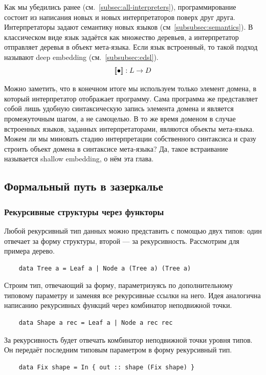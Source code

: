 
Как мы убедились ранее (см.~\ref{subsec:all-interpreters}), программирование состоит из написания новых и новых интерпретаторов поверх друг друга.
Интерпретаторы задают семантику новых языков (см~\ref{subsubsec:semantics}).
В классическом виде язык задаётся как множество деревьев, а интерпретатор отправляет деревья в объект мета-языка.
Если язык встроенный, то такой подход называют deep embedding (см.~\ref{subsubsec:edsl}).
\[
    \llbracket{\bullet}\rrbracket : L \to D
\]

Можно заметить, что в конечном итоге мы используем только элемент домена, в который интерпретатор отображает программу.
Сама программа же представляет собой лишь удобную синтаксическую запись элемента домена и является промежуточным шагом, а не самоцелью.
В то же время доменом в случае встроенных языков, заданных интерпретаторами, являются объекты мета-языка.
Можем ли мы миновать стадию интерпретации собственного синтаксиса и сразу строить объект домена в синтаксисе мета-языка?
Да, такое встраивание называется shallow embedding, о нём эта глава.

\subsection{Формальный путь в зазеркалье}

\subsubsection{Рекурсивные структуры через функторы}

Любой рекурсивный тип данных можно представить с помощью двух типов: один отвечает за форму структуры, второй --- за рекурсивность.
Рассмотрим для примера дерево.
\begin{verbatim}
    data Tree a = Leaf a | Node a (Tree a) (Tree a)
\end{verbatim}

Строим тип, отвечающий за форму, параметризуясь по дополнительному типовому параметру и заменяя все рекурсивные ссылки на него.
Идея аналогична написанию рекурсивных функций через комбинатор неподвижной точки.
\begin{verbatim}
    data Shape a rec = Leaf a | Node a rec rec
\end{verbatim}

За рекурсивность будет отвечать комбинатор неподвижной точки уровня типов.
Он передаёт последним типовым параметром в форму рекурсивный тип.
\begin{verbatim}
    data Fix shape = In { out :: shape (Fix shape) }
\end{verbatim}

